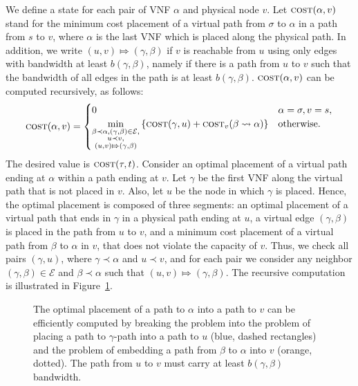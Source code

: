 \documentclass[runningheads]{llncs}
\newcommand{\set}[1]{\left\{ #1 \right\}}
\newcommand{\calE}{\mathcal{E}}
\newcommand{\cost}{\textsc{cost}\xspace}
\begin{document}
We define a state for each pair of VNF $\alpha$ and physical node $v$.
Let $\cost(\alpha,v)$ stand for the minimum cost placement of a
virtual path from $\sigma$ to $\alpha$ in a path from $s$ to $v$,
where $\alpha$ is the last VNF which is placed along the physical
path.
%
In addition, we write $(u, v) \Mapsto (\gamma,\beta)$ if $v$ is
reachable from $u$ using only edges with bandwidth at least
$b(\gamma,\beta)$, namely if there is a path from $u$ to $v$ such that
the bandwidth of all edges in the path is at least $b(\gamma,\beta)$.
%
$\cost(\alpha,v)$ can be computed recursively, as follows:
\[
\cost(\alpha,v) =
\begin{cases}
0 & \alpha = \sigma, v = s, \\
\displaystyle
\min_{
  \substack{\beta \prec \alpha, (\gamma,\beta) \in \calE, \\
           u \prec v, \\
         (u,v) \Mapsto (\gamma,\beta)}
     }
  \set{\cost(\gamma,u) + \cost_v(\beta \leadsto \alpha)}
  & \text{otherwise}.
\end{cases}
\]
The desired value is $\cost(\tau,t)$.
%
Consider an optimal placement of a virtual path ending at $\alpha$
within a path ending at $v$.  Let $\gamma$ be the first VNF along the
virtual path that is not placed in $v$.  Also, let $u$ be the node in
which $\gamma$ is placed.  Hence, the optimal placement is composed of
three segments: an optimal placement of a virtual path that ends in
$\gamma$ in a physical path ending at $u$, a virtual edge
$(\gamma,\beta)$ is placed in the path from $u$ to $v$, and a minimum
cost placement of a virtual path from $\beta$ to $\alpha$ in $v$, that
does not violate the capacity of $v$.
%
Thus, we check all pairs $(\gamma,u)$, where $\gamma \prec \alpha$ and
$u \prec v$, and for each pair we consider any neighbor
$(\gamma,\beta) \in \calE$ and $\beta \prec \alpha$ such that $(u, v)
\Mapsto (\gamma,\beta)$.
%
The recursive computation is illustrated in Figure~\ref{fig:dp1}.

\begin{figure}[t]
\centering
\scalebox{0.9}{

}
\caption{The optimal placement of a path to $\alpha$ into a path to
  $v$ can be efficiently computed by breaking the problem into the
  problem of placing a path to $\gamma$-path into a path to $u$ (blue,
  dashed rectangles) and the problem of embedding a path from $\beta$
  to $\alpha$ into $v$ (orange, dotted).  The path from $u$ to $v$
  must carry at least $b(\gamma,\beta)$ bandwidth.  }
\label{fig:dp1}
\end{figure}
\end{document}
